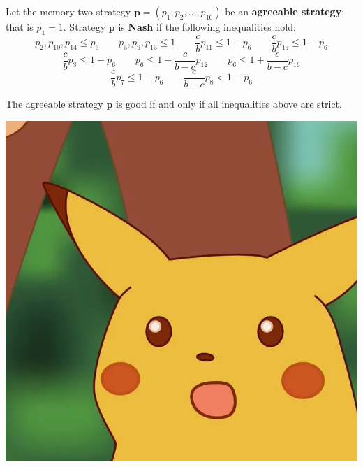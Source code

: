 \documentclass{beamer}
\begin{document}
\begin{frame}
    \footnotesize{
    \begin{theorem}
        Let the memory-two strategy \(\mathbf{p} = (p_{1}, p_{2}, \dots, p_{16})\) be an \textbf{agreeable
        strategy}; that is \(p_1 = 1\). Strategy \(\mathbf{p}\) is \textbf{Nash} if the
        following inequalities hold:
        \begin{equation*}
            p_2, p_{10}, p_{14}  \leq  p_{6}  \qquad  p_5, p_9, p_{13}  \leq 1 \qquad  \frac{c}{b} p_{11} \leq 1 - p_{6}  \qquad  \frac{c}{b} p_{15} \leq 1 - p_{6} 
        \end{equation*}
        \begin{equation*}
            \frac{c}{b} p_{3} \leq 1 - p_{6}  \qquad  p_6  \leq 1 + \frac{c}{b - c} p_{12} \qquad  p_6  \leq 1 + \frac{c}{b - c} p_{16}
        \end{equation*}
        \begin{equation*}
             \frac{c}{b} p_{7} \leq 1 - p_6  \qquad \frac{c}{b -c} p_{8} < 1 - p_6
        \end{equation*}

        The agreeable strategy \(\mathbf{p}\) is good if and only if all inequalities above are strict.
    \end{theorem}}
\end{frame}

\begin{frame}
    \begin{center}
        \includegraphics[width=.65\textwidth]{static/Ideas_Surprised_Pikachu_HD}
    \end{center}
\end{frame}
\end{document}
